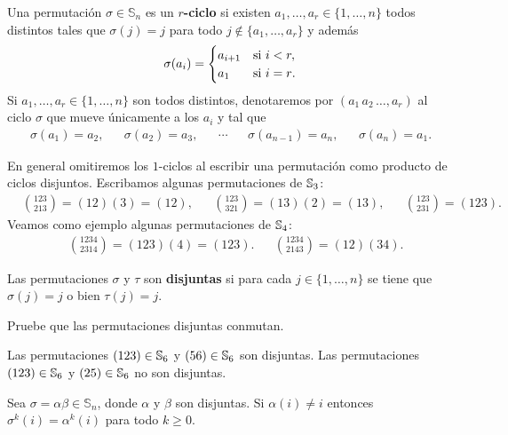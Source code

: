 \begin{block}
    Una permutación $\sigma\in\mathbb{S}_{n}$ es un $r$\textbf{-ciclo} si
    existen $a_{1},\dots,a_{r}\in\{1,\dots,n\}$ todos distintos tales que
    $\sigma(j)=j$ para todo $j\not\in\{a_{1},\dots,a_{r}\}$ y además 
    \[
    \sigma(a_{i})=\begin{cases}
        a_{i+1} & \text{si }i<r,\\
        a_{1} & \text{si \ensuremath{i=r}.}
    \end{cases}
    \]
	Si $a_1,\dots,a_r\in\{1,\dots,n\}$ son todos distintos, denotaremos por
	$(a_1\,a_2\,\dots,a_r)$ al ciclo $\sigma$ que mueve únicamente a los $a_i$
	y tal que 
	\begin{align*}
	\sigma(a_1)=a_2,
	&&
	\sigma(a_2)=a_3,
	&&
	\cdots
	&&
	\sigma(a_{n-1})=a_n,
	&&
	\sigma(a_n)=a_1.
	\end{align*}
\end{block}

\begin{example}
	En general omitiremos los $1$-ciclos al escribir una permutación como
	producto de ciclos disjuntos.  Escribamos algunas permutaciones de $\mathbb{S}_3$:
	\begin{align*}
		&\binom{123}{213}=(12)(3)=(12),
		&&
		\binom{123}{321}=(13)(2)=(13),
		&&
		\binom{123}{231}=(123). 
	\end{align*}
	Veamos como ejemplo algunas permutaciones de $\mathbb{S}_4$:
	\begin{align*}
		&\binom{1234}{2314}=(123)(4)=(123).
		&&
		\binom{1234}{2143}=(12)(34).
	\end{align*}
\end{example}

\begin{block}
	Las permutaciones $\sigma$ y $\tau$ son \textbf{disjuntas} si para cada
	$j\in\{1,\dots,n\}$ se tiene que $\sigma(j)=j$ o bien $\tau(j)=j$.
\end{block}

\begin{xca}
	\label{xca:disjuntas_conmutan}
	Pruebe que las permutaciones disjuntas conmutan.
\end{xca}

\begin{example}
    Las permutaciones $(123)\in\mathbb{S}_6$ y $(56)\in\mathbb{S}_6$ son disjuntas. Las
    permutaciones $(123)\in\mathbb{S}_6$ y $(25)\in\mathbb{S}_6$ no son disjuntas. 
\end{example}

\begin{xca}
    \label{xca:permutaciones}
	Sea $\sigma=\alpha\beta\in\mathbb{S}_{n}$, donde $\alpha$ y $\beta$ son
	disjuntas. Si $\alpha(i)\ne i$ entonces $\sigma^{k}(i)=\alpha^{k}(i)$ para
	todo $k\geq0$. 
\end{xca}

